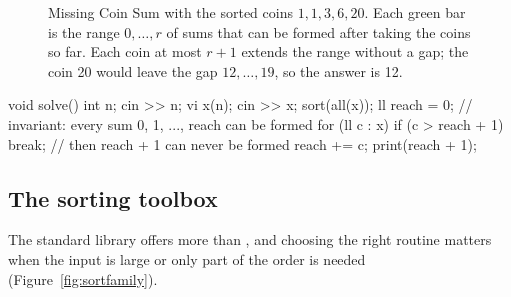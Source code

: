 \begin{figure}[htbp]
\centering
{}
\caption{Missing Coin Sum with the sorted coins $1, 1, 3, 6, 20$. Each green bar is the range $0, \ldots, r$ of sums that can
be formed after taking the coins so far. Each coin at most $r + 1$ extends the range without a gap; the coin 20 would leave
the gap $12, \ldots, 19$, so the answer is 12.}
\label{fig:missingcoin}
\end{figure}

\begin{code}
void solve() {
    int n;
    cin >> n;
    vi x(n);
    cin >> x;
    sort(all(x));
    ll reach = 0;  // invariant: every sum 0, 1, ..., reach can be formed
    for (ll c : x) {
        if (c > reach + 1) break;  // then reach + 1 can never be formed
        reach += c;
    }
    print(reach + 1);
}
\end{code}

\subsection{The sorting toolbox}

The standard library offers more than , and choosing the right routine matters when the input is large or only part
of the order is needed (Figure~\ref{fig:sortfamily}).

